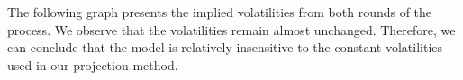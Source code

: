 The following graph presents the implied volatilities from both rounds of the process. We observe that the volatilities remain almost unchanged. Therefore, we can conclude that the model is relatively insensitive to the constant volatilities used in our projection method.







\begin{comment}
    \chapter{Results and variations}
This section provides an overview of the numerical outcomes generated by the methods we have introduced. We commence with a straightforward illustration from the example outlined in paper \cite{mission}, where in the focus lies on elucidating the process of designing neural network structures and selecting hyperparameters. In the subsequent example, we extend this algorithm to a specific interest rate product under more intricate conditions, subsequently comparing the outcomes with benchmark methods. Lastly, we propose a more generalized model and show its results.

\section{Application on 1D vanilla American put option}
Let's consider American options within the framework of the Black-Scholes Model. The price of this asset adheres to the dynamic described by $X_{t}=S_{t}$: $$dS_{t}=rS_{t}dt+\sigma S_{t}dW_{t}.$$ and the discounted factor is $\beta_{t}=\exp(rt)$. Consequently, the core formula for this scenario can be simplified to 
$$ \frac{V_{t_{i+1}}}{\beta_{\Delta t}} \approx 
        \Phi_{t_{i}}(S_{t_{i}})+
        \beta_{t_{i}}(\Psi_{t_{i}}(S_{t_{i}})\Delta W_{t_{i}} + \sigma \Psi^{'}_{t_{i}}(S_{t_{i}})(\frac{\Delta W_{t_{i}}^{2}-\Delta t}{2}))$$

In the first example, we assess the pricing of a one-dimensional (1D) vanilla American put option. This option matures at $T = 1$ and holds a strike price of $K = 40$, with an initial price of $S_{0} = 36$. The associated parameters include a risk-free rate, $r = 0.06$, and a volatility factor, $\sigma = 0.2$. The payoff function at time $t$ is represented as $Z(S_{t},K) = (K-S_{t})^{+}$.

A crucial point lies in the method of constructing the neural network model within the black-box framework. Through exploratory experiments, we have identified an effective strategy involving the utilization of two mutually independent networks to separately approximate these two functions, as depicted in the following graph \ref{NN}. This approach proves advantageous, as martingale increment and continuation value functions can exhibit diverse complexities, particularly in intricate models characterized by higher dimensions.
\begin{figure}[ht]
\texttt{[image: images/NN.png]} 
\caption{The Structure of Neural Networks}
\label{NN} 
\end{figure}


\end{comment}
